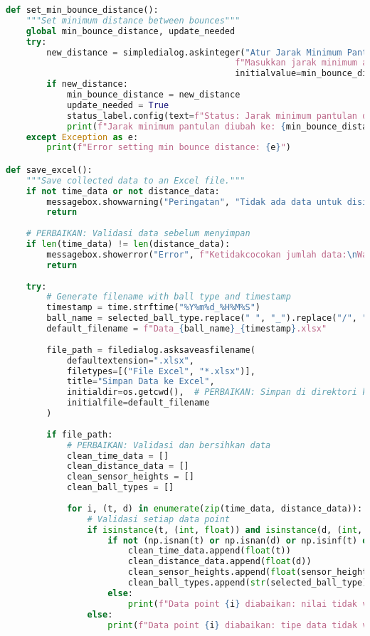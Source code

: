 \begin{itemize}
\begin{scriptsize}
\begin{lstlisting}[language=python]
def set_min_bounce_distance():
    """Set minimum distance between bounces"""
    global min_bounce_distance, update_needed
    try:
        new_distance = simpledialog.askinteger("Atur Jarak Minimum Pantulan", 
                                             f"Masukkan jarak minimum antar pantulan (titik data):\nSaat ini: {min_bounce_distance}",
                                             initialvalue=min_bounce_distance, minvalue=1, maxvalue=100)
        if new_distance:
            min_bounce_distance = new_distance
            update_needed = True
            status_label.config(text=f"Status: Jarak minimum pantulan diatur ke {min_bounce_distance}", fg="blue")
            print(f"Jarak minimum pantulan diubah ke: {min_bounce_distance}")
    except Exception as e:
        print(f"Error setting min bounce distance: {e}")

def save_excel():
    """Save collected data to an Excel file."""
    if not time_data or not distance_data:
        messagebox.showwarning("Peringatan", "Tidak ada data untuk disimpan.")
        return
    
    # PERBAIKAN: Validasi data sebelum menyimpan
    if len(time_data) != len(distance_data):
        messagebox.showerror("Error", f"Ketidakcocokan jumlah data:\nWaktu: {len(time_data)}\nJarak: {len(distance_data)}")
        return
    
    try:
        # Generate filename with ball type and timestamp
        timestamp = time.strftime("%Y%m%d_%H%M%S")
        ball_name = selected_ball_type.replace(" ", "_").replace("/", "_")  # PERBAIKAN: Hapus karakter invalid
        default_filename = f"Data_{ball_name}_{timestamp}.xlsx"
        
        file_path = filedialog.asksaveasfilename(
            defaultextension=".xlsx", 
            filetypes=[("File Excel", "*.xlsx")],
            title="Simpan Data ke Excel",
            initialdir=os.getcwd(),  # PERBAIKAN: Simpan di direktori kerja saat ini
            initialfile=default_filename
        )
        
        if file_path:
            # PERBAIKAN: Validasi dan bersihkan data
            clean_time_data = []
            clean_distance_data = []
            clean_sensor_heights = []
            clean_ball_types = []
            
            for i, (t, d) in enumerate(zip(time_data, distance_data)):
                # Validasi setiap data point
                if isinstance(t, (int, float)) and isinstance(d, (int, float)):
                    if not (np.isnan(t) or np.isnan(d) or np.isinf(t) or np.isinf(d)):
                        clean_time_data.append(float(t))
                        clean_distance_data.append(float(d))
                        clean_sensor_heights.append(float(sensor_height))
                        clean_ball_types.append(str(selected_ball_type))
                    else:
                        print(f"Data point {i} diabaikan: nilai tidak valid (NaN/Inf)")
                else:
                    print(f"Data point {i} diabaikan: tipe data tidak valid")
            

\end{lstlisting}
\end{scriptsize}
\end{itemize}

